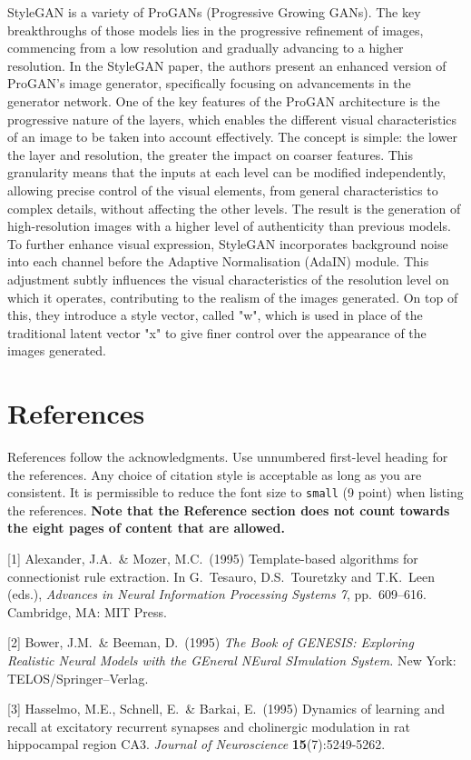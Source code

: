 \documentclass{article}
\begin{document}
StyleGAN is a variety of ProGANs (Progressive Growing GANs). The key breakthroughs of those models lies in the progressive refinement of images, commencing from a low resolution and gradually advancing to a higher resolution. In the StyleGAN paper, the authors present an enhanced version of ProGAN's image generator, specifically focusing on advancements in the generator network.
One of the key features of the ProGAN architecture is the progressive nature of the layers, which enables the different visual characteristics of an image to be taken into account effectively. The concept is simple: the lower the layer and resolution, the greater the impact on coarser features. This granularity means that the inputs at each level can be modified independently, allowing precise control of the visual elements, from general characteristics to complex details, without affecting the other levels. The result is the generation of high-resolution images with a higher level of authenticity than previous models.
To further enhance visual expression, StyleGAN incorporates background noise into each channel before the Adaptive Normalisation (AdaIN) module. This adjustment subtly influences the visual characteristics of the resolution level on which it operates, contributing to the realism of the images generated.
On top of this, they introduce a style vector, called "w", which is used in place of the traditional latent vector "x" to give finer control over the appearance of the images generated.


\section*{References}

References follow the acknowledgments. Use unnumbered first-level heading for
the references. Any choice of citation style is acceptable as long as you are
consistent. It is permissible to reduce the font size to \verb+small+ (9 point)
when listing the references.
{\bf Note that the Reference section does not count towards the eight pages of content that are allowed.}
\medskip

\small

[1] Alexander, J.A.\ \& Mozer, M.C.\ (1995) Template-based algorithms for
connectionist rule extraction. In G.\ Tesauro, D.S.\ Touretzky and T.K.\ Leen
(eds.), {\it Advances in Neural Information Processing Systems 7},
pp.\ 609--616. Cambridge, MA: MIT Press.

[2] Bower, J.M.\ \& Beeman, D.\ (1995) {\it The Book of GENESIS: Exploring
  Realistic Neural Models with the GEneral NEural SImulation System.}  New York:
TELOS/Springer--Verlag.

[3] Hasselmo, M.E., Schnell, E.\ \& Barkai, E.\ (1995) Dynamics of learning and
recall at excitatory recurrent synapses and cholinergic modulation in rat
hippocampal region CA3. {\it Journal of Neuroscience} {\bf 15}(7):5249-5262.
\end{document}
